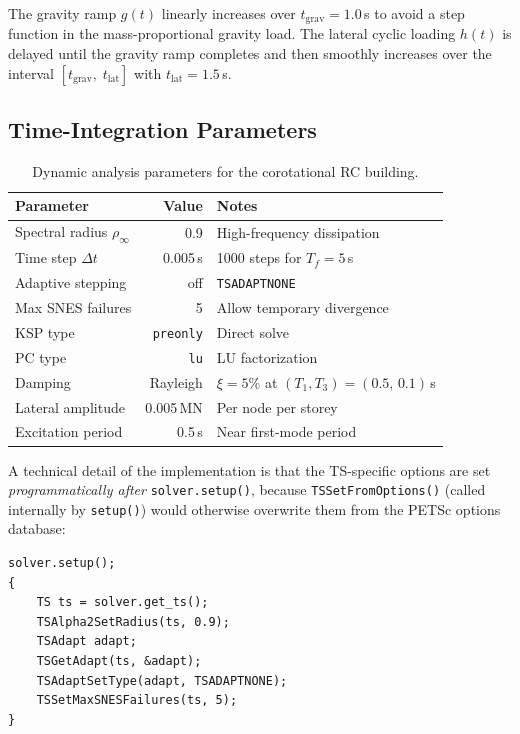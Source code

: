 The gravity ramp $g(t)$ linearly increases over $t_\mathrm{grav} = 1.0$\,s
to avoid a step function in the mass-proportional gravity load.  The
lateral cyclic loading $h(t)$ is delayed until the gravity ramp
completes and then smoothly increases over the interval
$[t_\mathrm{grav},\; t_\mathrm{lat}]$ with $t_\mathrm{lat} = 1.5$\,s.

\subsection{Time-Integration Parameters}

\begin{table}[htbp]
\centering
\caption{Dynamic analysis parameters for the corotational RC building.}
\label{tab:corot-params}
\begin{tabular}{lrl}
\toprule
  \textbf{Parameter} & \textbf{Value} & \textbf{Notes} \\
\midrule
  Spectral radius $\rho_\infty$ & 0.9 & High-frequency dissipation \\
  Time step $\Delta t$ & 0.005\,s & 1000 steps for $T_f = 5\,$s \\
  Adaptive stepping & off & \texttt{TSADAPTNONE} \\
  Max SNES failures & 5 & Allow temporary divergence \\
  KSP type & \texttt{preonly} & Direct solve \\
  PC type  & \texttt{lu} & LU factorization \\
  Damping  & Rayleigh & $\xi = 5\%$ at $(T_1, T_3) = (0.5,\, 0.1)\,$s \\
  Lateral amplitude & 0.005\,MN & Per node per storey \\
  Excitation period & 0.5\,s & Near first-mode period \\
\bottomrule
\end{tabular}
\end{table}

A technical detail of the implementation is that the TS-specific
options are set \emph{programmatically after} \texttt{solver.setup()},
because \texttt{TSSetFromOptions()} (called internally by
\texttt{setup()}) would otherwise overwrite them from the PETSc options
database:
\begin{lstlisting}
solver.setup();
{
    TS ts = solver.get_ts();
    TSAlpha2SetRadius(ts, 0.9);
    TSAdapt adapt;
    TSGetAdapt(ts, &adapt);
    TSAdaptSetType(adapt, TSADAPTNONE);
    TSSetMaxSNESFailures(ts, 5);
}
\end{lstlisting}



